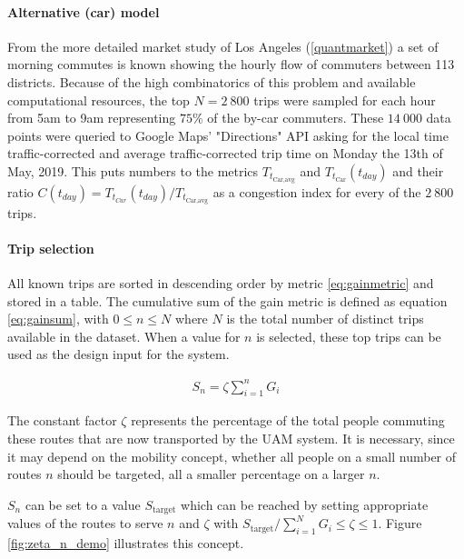 \paragraph{Alternative (car) model}

From the more detailed market study of Los Angeles (\autoref{quantmarket}) a set of morning commutes is known showing the hourly flow of commuters between 113 districts. Because of the high combinatorics of this problem and available computational resources, the top $N = 2\ 800$ trips were sampled for each hour from 5am to 9am representing $75\%$ of the by-car commuters. These $14\ 000$ data points were queried to Google Maps' "Directions" API asking for the local time traffic-corrected and average traffic-corrected trip time on Monday the 13th of May, 2019. This puts numbers to the metrics $T_{t_\text{Car,avg}}$ and $T_{t_{\text{Car} }}(t_{day})$ and their ratio $C(t_{day}) = T_{t_{Car}}(t_{day}) / T_{t_\text{Car,avg}}$ as a congestion index for every of the $2\ 800$ trips.



\paragraph{Trip selection}

All known trips are sorted in descending order by metric \ref{eq:gainmetric} and stored in a table. The cumulative sum of the gain metric is defined as equation \ref{eq:gainsum}, with $0\leq n\leq N$ where $N$ is the total number of distinct trips available in the dataset. When a value for $n$ is selected, these top trips can be used as the design input for the system.

\begin{align} \label{eq:gainsum}
    S_n = \zeta \sum_{i=1}^{n}{G_i}
\end{align}

The constant factor $\zeta$ represents the percentage of the total people commuting these routes that are now transported by the UAM system. It is necessary, since it may depend on the mobility concept, whether all people on a small number of routes $n$ should be targeted, all a smaller percentage on a larger $n$.

$S_n$ can be set to a value $S_{\text{target}}$ which can be reached by setting appropriate values of the routes to serve $n$ and $\zeta$ with $S_{\text{target}} / \sum_{i=1}^{N}{G_i}\leq \zeta \leq 1$. Figure \ref{fig:zeta_n_demo} illustrates this concept. 

